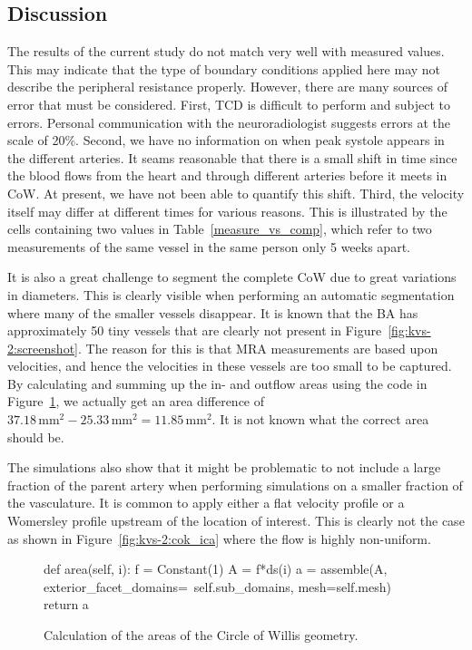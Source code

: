 \subsection{Discussion}

The results of the current study do not match very well with measured
values. This may indicate that the type of boundary conditions applied
here may not describe the peripheral resistance properly. However,
there are many sources of error that must be considered.  First, TCD
is difficult to perform and subject to errors. Personal communication
with the neuroradiologist suggests errors at the scale of 20\%.
Second, we have no information on when peak systole appears in the
different arteries. It seams reasonable that there is a small shift in
time since the blood flows from the heart and through different
arteries before it meets in CoW. At present, we have not been able to
quantify this shift. Third, the velocity itself may differ at
different times for various reasons. This is illustrated by the cells
containing two values in Table~\ref{measure_vs_comp}, which refer to
two measurements of the same vessel in the same person only 5 weeks
apart.

It is also a great challenge to segment the complete CoW due to great
variations in diameters. This is clearly visible when performing an
automatic segmentation where many of the smaller vessels disappear.
It is known that the BA has approximately 50 tiny vessels that are
clearly not present in Figure~\ref{fig:kvs-2:screenshot}. The reason
for this is that MRA measurements are based upon velocities, and hence
the velocities in these vessels are too small to be captured. By
calculating and summing up the in- and outflow areas using the code in
Figure~\ref{fig:kvs-2:area_code}, we actually get an area difference
of
$37.18\,\mathrm{mm}^2-25.33\,\mathrm{mm}^2=11.85\,\mathrm{mm}^2$. It
is not known what the correct area should be.

The simulations also show that it might be problematic to not include
a large fraction of the parent artery when performing simulations on a
smaller fraction of the vasculature. It is common to apply either a
flat velocity profile or a Womersley profile upstream of the location
of interest. This is clearly not the case as shown in
Figure~\ref{fig:kvs-2:cok_ica} where the flow is highly non-uniform.

\begin{figure}
\begin{python}
def area(self, i):
    f = Constant(1)
    A = f*ds(i)
    a = assemble(A,
                 exterior_facet_domains=\
                 self.sub_domains,
                 mesh=self.mesh)
    return a
\end{python}
\caption{Calculation of the areas of the Circle of Willis geometry.}
\label{fig:kvs-2:area_code}
\end{figure}

